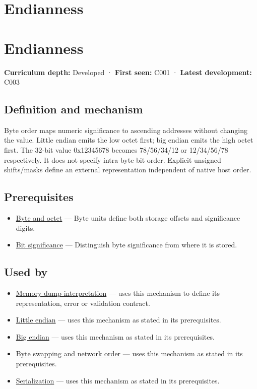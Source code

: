 \hypertarget{appendix-bc07c3d25b18}{}
\section*{Endianness}
\section{Endianness}\label{endianness}

\textbf{Curriculum depth:} Developed · \textbf{First seen:} C001 · \textbf{Latest development:} C003

\subsection{Definition and mechanism}\label{definition-and-mechanism}

Byte order maps numeric significance to ascending addresses without changing the value. Little endian emits the low octet first; big endian emits the high octet first. The 32-bit value 0x12345678 becomes 78/56/34/12 or 12/34/56/78 respectively. It does not specify intra-byte bit order. Explicit unsigned shifts/masks define an external representation independent of native host order.

\subsection{Prerequisites}\label{prerequisites}

\begin{itemize}
\tightlist
\item
  \hyperref[appendix-5bee2df85484]{Byte and octet} --- Byte units define both storage offsets and significance digits.
\item
  \hyperref[appendix-280445746493]{Bit significance} --- Distinguish byte significance from where it is stored.
\end{itemize}

\subsection{Used by}\label{used-by}

\begin{itemize}
\item
  \hyperref[appendix-230b59c0676b]{Memory dump interpretation} --- uses this mechanism to define its representation, error or validation contract.
\item
  \hyperref[appendix-367b6abf460e]{Little endian} --- uses this mechanism as stated in its prerequisites.
\item
  \hyperref[appendix-92e040df969a]{Big endian} --- uses this mechanism as stated in its prerequisites.
\item
  \hyperref[appendix-11ba36693aa2]{Byte swapping and network order} --- uses this mechanism as stated in its prerequisites.
\item
  \hyperref[appendix-91d09ebed979]{Serialization} --- uses this mechanism as stated in its prerequisites.
\end{itemize}

